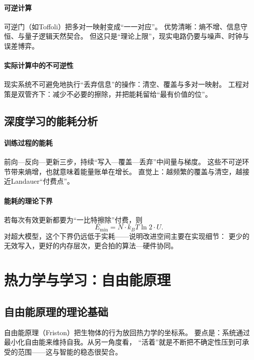 \paragraph{可逆计算}
可逆门（如Toffoli）把多对一映射变成“一一对应”。  
优势清晰：熵不增、信息守恒、与量子逻辑天然契合。  
但这只是“理论上限”，现实电路仍要与噪声、时钟与误差博弈。

\paragraph{实际计算中的不可逆性}
现实系统不可避免地执行“丢弃信息”的操作：清空、覆盖与多对一映射。  
工程对策是双管齐下：减少不必要的擦除，并把能耗留给“最有价值的位”。

\subsection{深度学习的能耗分析}

\paragraph{训练过程的能耗}
前向—反向—更新三步，持续“写入—覆盖—丢弃”中间量与梯度。  
这些不可逆环节带来熵增，也就意味着能量账单在增长。  
直觉上：越频繁的覆盖与清空，越接近Landauer“付费点”。

\paragraph{能耗的理论下界}
若每次有效更新都要为“一比特擦除”付费，则
$$E_{\min}=N\cdot k_BT\ln2\cdot U.$$
对超大模型，这个下界仍远低于实耗——\;说明改进空间主要在实现细节：  
更少的无效写入，更好的内存层次，更合拍的算法—硬件协同。



\section{热力学与学习：自由能原理}

\subsection{自由能原理的理论基础}

自由能原理（Friston）把生物体的行为放回热力学的坐标系。  
要点是：系统通过最小化自由能来维持自我。\;从另一角度看，  
“活着”就是不断把不确定性压到可承受的范围——\;这与智能的稳态很契合。

